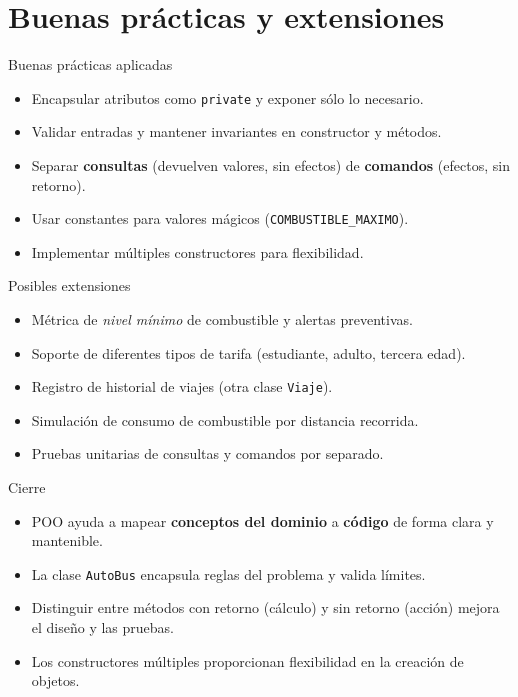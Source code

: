 \documentclass[aspectratio=169]{beamer}
\begin{document}
\section{Buenas prácticas y extensiones}

\begin{frame}{Buenas prácticas aplicadas}
  \begin{itemize}
    \item Encapsular atributos como \texttt{private} y exponer sólo lo necesario.
    \item Validar entradas y mantener invariantes en constructor y métodos.
    \item Separar \textbf{consultas} (devuelven valores, sin efectos) de \textbf{comandos} (efectos, sin retorno).
    \item Usar constantes para valores mágicos (\texttt{COMBUSTIBLE\_MAXIMO}).
    \item Implementar múltiples constructores para flexibilidad.
  \end{itemize}
\end{frame}

\begin{frame}{Posibles extensiones}
  \begin{itemize}
    \item Métrica de \textit{nivel mínimo} de combustible y alertas preventivas.
    \item Soporte de diferentes tipos de tarifa (estudiante, adulto, tercera edad).
    \item Registro de historial de viajes (otra clase \texttt{Viaje}).
    \item Simulación de consumo de combustible por distancia recorrida.
    \item Pruebas unitarias de consultas y comandos por separado.
  \end{itemize}
\end{frame}

\begin{frame}{Cierre}
  \begin{itemize}
    \item POO ayuda a mapear \textbf{conceptos del dominio} a \textbf{código} de forma clara y mantenible.
    \item La clase \texttt{AutoBus} encapsula reglas del problema y valida límites.
    \item Distinguir entre métodos con retorno (cálculo) y sin retorno (acción) mejora el diseño y las pruebas.
    \item Los constructores múltiples proporcionan flexibilidad en la creación de objetos.
  \end{itemize}
\end{frame}
\end{document}
